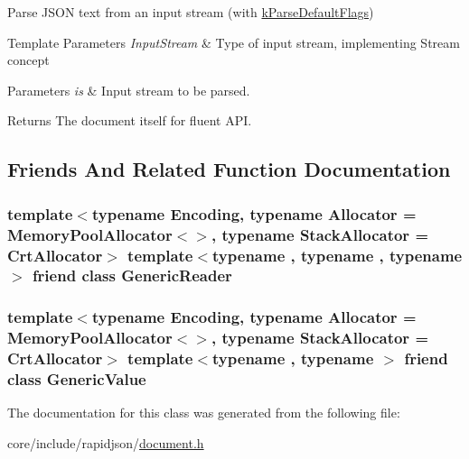 Parse J\+S\+ON text from an input stream (with \hyperlink{reader_8h_ab7be7dabe6ffcba60fad441505583450a9104b0946d648e9467cb7a967401ec80}{k\+Parse\+Default\+Flags}) 


\begin{DoxyTemplParams}{Template Parameters}
{\em Input\+Stream} & Type of input stream, implementing Stream concept \\
\hline
\end{DoxyTemplParams}

\begin{DoxyParams}{Parameters}
{\em is} & Input stream to be parsed. \\
\hline
\end{DoxyParams}
\begin{DoxyReturn}{Returns}
The document itself for fluent A\+PI. 
\end{DoxyReturn}


\subsection{Friends And Related Function Documentation}
\subsubsection[{\texorpdfstring{Generic\+Reader}{GenericReader}}]{\setlength{\rightskip}{0pt plus 5cm}template$<$typename Encoding, typename Allocator = Memory\+Pool\+Allocator$<$$>$, typename Stack\+Allocator = Crt\+Allocator$>$ template$<$typename , typename , typename $>$ friend class {\bf Generic\+Reader}\hspace{0.3cm}{\ttfamily [friend]}}\hypertarget{classGenericDocument_a22b985b0f7f78ef254a566655ee0550f}{}\label{classGenericDocument_a22b985b0f7f78ef254a566655ee0550f}
\subsubsection[{\texorpdfstring{Generic\+Value}{GenericValue}}]{\setlength{\rightskip}{0pt plus 5cm}template$<$typename Encoding, typename Allocator = Memory\+Pool\+Allocator$<$$>$, typename Stack\+Allocator = Crt\+Allocator$>$ template$<$typename , typename $>$ friend class {\bf Generic\+Value}\hspace{0.3cm}{\ttfamily [friend]}}\hypertarget{classGenericDocument_a899449e1a645b5e377af059fb61113d8}{}\label{classGenericDocument_a899449e1a645b5e377af059fb61113d8}


The documentation for this class was generated from the following file\+:\begin{DoxyCompactItemize}
\item 
core/include/rapidjson/\hyperlink{document_8h}{document.\+h}\end{DoxyCompactItemize}
